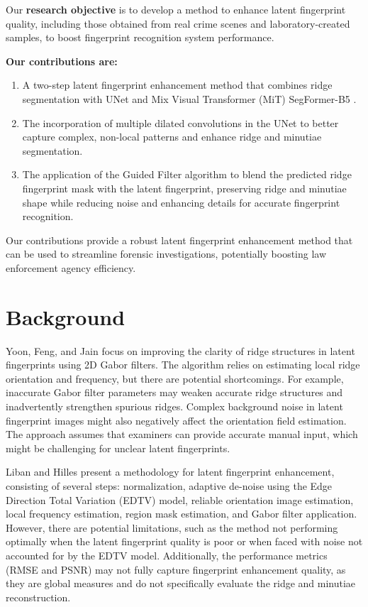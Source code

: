 \documentclass[twocolumn, switch]{article} %
\begin{document}
Our \textbf{research objective} is to develop a method to enhance latent fingerprint quality, including those obtained from real crime scenes and laboratory-created samples, to boost fingerprint recognition system performance.


\textbf{Our contributions are:}
\begin{enumerate}[noitemsep]
    \item A two-step latent fingerprint enhancement method that combines ridge segmentation with UNet \cite{DBLP:journals/corr/RonnebergerFB15} and Mix Visual Transformer (MiT) SegFormer-B5 \cite{DBLP:journals/corr/abs-2105-15203}.
    \item The incorporation of multiple dilated convolutions in the UNet to better capture complex, non-local patterns and enhance ridge and minutiae segmentation.
    \item The application of the Guided Filter algorithm \cite{6319316} to blend the predicted ridge fingerprint mask with the latent fingerprint, preserving ridge and minutiae shape while reducing noise and enhancing details for accurate fingerprint recognition.
\end{enumerate}

Our contributions provide a robust latent fingerprint enhancement method that can be used to streamline forensic investigations, potentially boosting law enforcement agency efficiency. 



\section{Background}

Yoon, Feng, and Jain \cite{yoon2010latent} focus on improving the clarity of ridge structures in latent fingerprints using 2D Gabor filters. The algorithm relies on estimating local ridge orientation and frequency, but there are potential shortcomings. For example, inaccurate Gabor filter parameters may weaken accurate ridge structures and inadvertently strengthen spurious ridges. Complex background noise in latent fingerprint images might also negatively affect the orientation field estimation. The approach assumes that examiners can provide accurate manual input, which might be challenging for unclear latent fingerprints. 

Liban and Hilles \cite{liban2018latent} present a methodology for latent fingerprint enhancement, consisting of several steps: normalization, adaptive de-noise using the Edge Direction Total Variation (EDTV) model, reliable orientation image estimation, local frequency estimation, region mask estimation, and Gabor filter application. However, there are potential limitations, such as the method not performing optimally when the latent fingerprint quality is poor or when faced with noise not accounted for by the EDTV model. Additionally, the performance metrics (RMSE and PSNR) may not fully capture fingerprint enhancement quality, as they are global measures and do not specifically evaluate the ridge and minutiae reconstruction.
\end{document}
